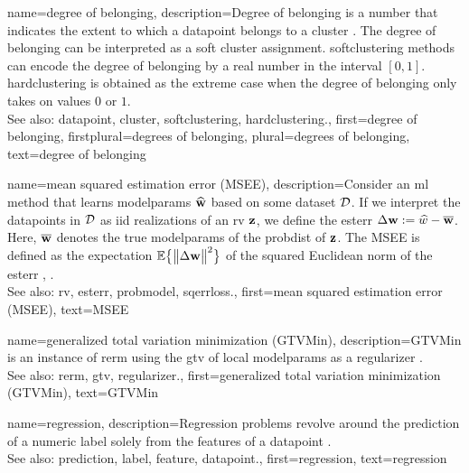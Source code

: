 {name={degree of belonging}, 
	description={Degree of belonging is a number that indicates the extent to which a \gls{datapoint} 
		belongs to a \gls{cluster} \cite[Ch. 8]{MLBasics}. The degree of belonging can be 
		interpreted as a soft \gls{cluster} assignment. \Gls{softclustering} methods can 
		encode the degree of belonging by a real number in the interval $[0,1]$. 
		\Gls{hardclustering} is obtained as the extreme case when the degree of belonging 
		only takes on values $0$ or $1$.
					\\ 
		See also: \gls{datapoint}, \gls{cluster}, \gls{softclustering}, \gls{hardclustering}.}, 
	first={degree of belonging},
	firstplural={degrees of belonging},
	plural={degrees of belonging},
	text={degree of belonging} 
}

{name={mean squared estimation error (MSEE)},
	description={Consider an \gls{ml} method that 
		learns \gls{modelparams} $\widehat{{\bf w}}$ based on some \gls{dataset} $\mathcal{D}$. 
		If we interpret the \glspl{datapoint} in $\mathcal{D}$ as \gls{iid} \glspl{realization} of an \gls{rv} ${\bf z}$, 
		we define the \gls{esterr} $\Delta {\bf w} := \widehat{w} - \overline{{\bf w}}$. 
		Here, $\overline{{\bf w}}$ denotes the true \gls{modelparams} of the \gls{probdist} 
		of ${\bf z}$. The MSEE is 
		defined as the \gls{expectation} $\mathbb{E} \big\{ \big\| \Delta {\bf w} \big\|^{2} \big\}$ of the 
		squared Euclidean \gls{norm} of the \gls{esterr} \cite{LC}, \cite{kay}.
					\\ 
		See also:  \gls{rv}, \gls{esterr}, \gls{probmodel}, \gls{sqerrloss}.},
	first={mean squared estimation error (MSEE)},
	text={MSEE} 
}

{name={generalized total variation minimization (GTVMin)},
	description={GTVMin is an instance of \gls{rerm} 
		using the \gls{gtv} of local \gls{modelparams} as a \gls{regularizer} \cite{ClusteredFLTVMinTSP}.
					\\ 
		See also: \gls{rerm}, \gls{gtv}, \gls{regularizer}.},
	first={generalized total variation minimization (GTVMin)},
	text={GTVMin} 
}

{name={regression},
	description={Regression problems revolve around the 
		\gls{prediction} of a numeric \gls{label} solely from the \glspl{feature} of a \gls{datapoint} \cite[Ch. 2]{MLBasics}.
					\\ 
		See also: \gls{prediction}, \gls{label}, \gls{feature}, \gls{datapoint}.},
	first={regression},
	text={regression} 
}

